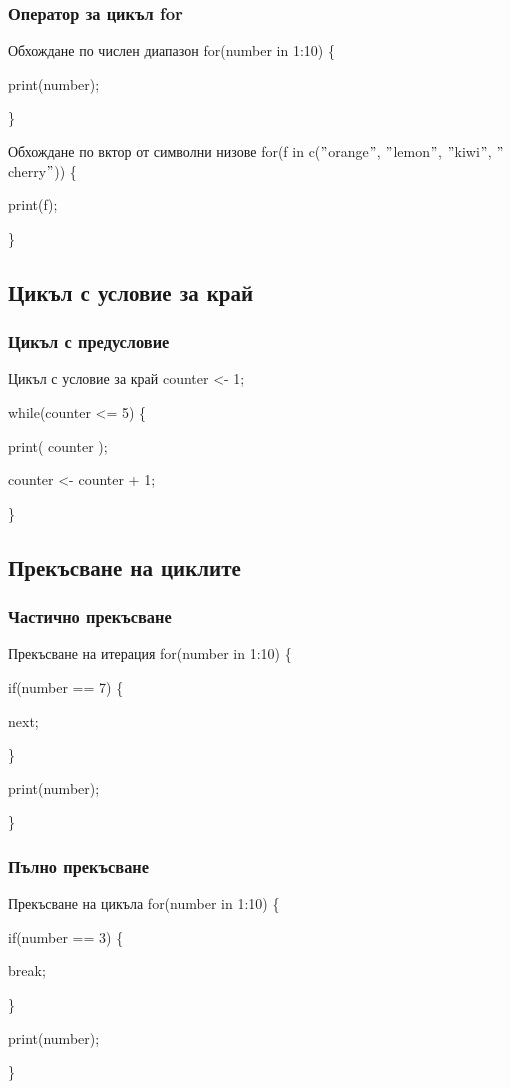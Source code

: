 \documentclass{beamer}
\begin{document}
\begin{frame}
\frametitle{Оператор за цикъл for}
\begin{block}{Обхождане по числен диапазон}
for(number in 1:10) \{ 

	print(number); 
	
\}
\end{block}

\begin{block}{Обхождане по вктор от символни низове}
for(f in c($"$orange$"$, $"$lemon$"$, $"$kiwi$"$, $"$cherry$"$)) \{ 

	print(f); 

\}
\end{block}
\end{frame}

\subsection{Цикъл с условие за край}

\begin{frame}
\frametitle{Цикъл с предусловие}
\begin{block}{Цикъл с условие за край}
counter <- 1;

while(counter <= 5) \{ 

	print( counter ); 
	
	counter <- counter + 1;

\}
\end{block}
\end{frame}

\subsection{Прекъсване на циклите}

\begin{frame}
\frametitle{Частично прекъсване}
\begin{block}{Прекъсване на итерация}
for(number in 1:10) \{ 

	if(number == 7) \{
	
		next;
		
	\}

	print(number);
	
\}
\end{block}
\end{frame}

\begin{frame}
\frametitle{Пълно прекъсване}
\begin{block}{Прекъсване на цикъла}
for(number in 1:10) \{ 

	if(number == 3) \{
	
		break;
		
	\}

	print(number);

\}
\end{block}
\end{frame}
\end{document}
